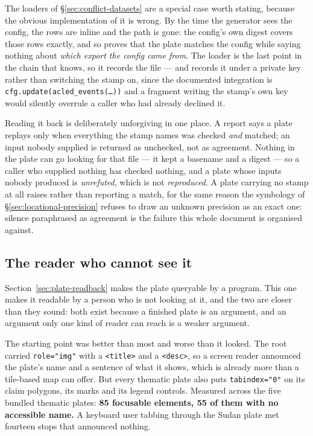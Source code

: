 \documentclass[11pt]{article}
\begin{document}
The loaders of \S\ref{sec:conflict-datasets} are a special case worth
stating, because the obvious implementation of it is wrong. By the time the
generator sees the config, the rows are inline and the path is gone: the
config's own digest covers those rows exactly, and so proves that the plate
matches the config while saying nothing about \emph{which export the config
came from}. The loader is the last point in the chain that knows, so it
records the file --- and records it under a private key rather than switching
the stamp on, since the documented integration is
\texttt{cfg.update(acled\_events(\ldots))} and a fragment writing the stamp's
own key would silently overrule a caller who had already declined it.

Reading it back is deliberately unforgiving in one place. A report says a
plate replays only when everything the stamp names was checked \emph{and}
matched; an input nobody supplied is returned as unchecked, not as agreement.
Nothing in the plate can go looking for that file --- it kept a basename and
a digest --- so a caller who supplied nothing has checked nothing, and a
plate whose inputs nobody produced is \emph{unrefuted}, which is not
\emph{reproduced}. A plate carrying no stamp at all raises rather than
reporting a match, for the same reason the symbology of
\S\ref{sec:locational-precision} refuses to draw an unknown precision as an
exact one: silence paraphrased as agreement is the failure this whole
document is organised against.

\subsection{The reader who cannot see it}
\label{sec:non-visual}

Section~\ref{sec:plate-readback} makes the plate queryable by a program.
This one makes it readable by a person who is not looking at it, and the two
are closer than they sound: both exist because a finished plate is an
argument, and an argument only one kind of reader can reach is a weaker
argument.

The starting point was better than most and worse than it looked. The root
carried \texttt{role="img"} with a \texttt{<title>} and a \texttt{<desc>}, so
a screen reader announced the plate's name and a sentence of what it shows,
which is already more than a tile-based map can offer. But every thematic
plate also puts \texttt{tabindex="0"} on its claim polygons, its marks and its
legend controls. Measured across the five bundled thematic plates: \textbf{85
focusable elements, 55 of them with no accessible name.} A keyboard user
tabbing through the Sudan plate met fourteen stops that announced nothing.
\end{document}
